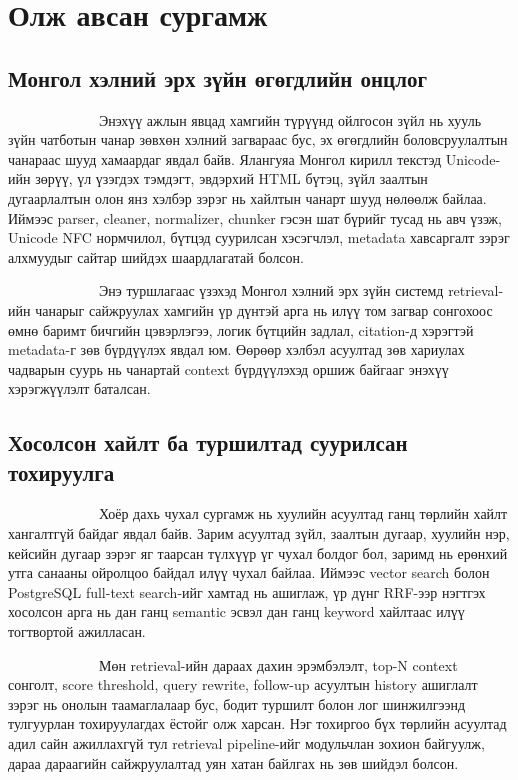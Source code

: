 \documentclass[12pt,A4]{report}
\begin{document}
\chapter{Олж авсан сургамж}

\section{Монгол хэлний эрх зүйн өгөгдлийн онцлог}

\ \ \ \ \ \ \ \ \  \ \ \ \ Энэхүү ажлын явцад хамгийн түрүүнд ойлгосон зүйл нь хууль зүйн чатботын чанар зөвхөн хэлний загвараас бус, эх өгөгдлийн боловсруулалтын чанараас шууд хамаардаг явдал байв. Ялангуяа Монгол кирилл текстэд Unicode-ийн зөрүү, үл үзэгдэх тэмдэгт, эвдэрхий HTML бүтэц, зүйл заалтын дугаарлалтын олон янз хэлбэр зэрэг нь хайлтын чанарт шууд нөлөөлж байлаа. Иймээс parser, cleaner, normalizer, chunker гэсэн шат бүрийг тусад нь авч үзэж, Unicode NFC нормчилол, бүтцэд суурилсан хэсэгчлэл, metadata хавсаргалт зэрэг алхмуудыг сайтар шийдэх шаардлагатай болсон.

\ \ \ \ \ \ \ \ \  \ \ \ \ Энэ туршлагаас үзэхэд Монгол хэлний эрх зүйн системд retrieval-ийн чанарыг сайжруулах хамгийн үр дүнтэй арга нь илүү том загвар сонгохоос өмнө баримт бичгийн цэвэрлэгээ, логик бүтцийн задлал, citation-д хэрэгтэй metadata-г зөв бүрдүүлэх явдал юм. Өөрөөр хэлбэл асуултад зөв хариулах чадварын суурь нь чанартай context бүрдүүлэхэд оршиж байгааг энэхүү хэрэгжүүлэлт баталсан.

\section{Хосолсон хайлт ба туршилтад суурилсан тохируулга}

\ \ \ \ \ \ \ \ \  \ \ \ \ Хоёр дахь чухал сургамж нь хуулийн асуултад ганц төрлийн хайлт хангалтгүй байдаг явдал байв. Зарим асуултад зүйл, заалтын дугаар, хуулийн нэр, кейсийн дугаар зэрэг яг таарсан түлхүүр үг чухал болдог бол, заримд нь ерөнхий утга санааны ойролцоо байдал илүү чухал байлаа. Иймээс vector search болон PostgreSQL full-text search-ийг хамтад нь ашиглаж, үр дүнг RRF-ээр нэгтгэх хосолсон арга нь дан ганц semantic эсвэл дан ганц keyword хайлтаас илүү тогтвортой ажилласан.

\ \ \ \ \ \ \ \ \  \ \ \ \ Мөн retrieval-ийн дараах дахин эрэмбэлэлт, top-N context сонголт, score threshold, query rewrite, follow-up асуултын history ашиглалт зэрэг нь онолын таамаглалаар бус, бодит туршилт болон лог шинжилгээнд тулгуурлан тохируулагдах ёстойг олж харсан. Нэг тохиргоо бүх төрлийн асуултад адил сайн ажиллахгүй тул retrieval pipeline-ийг модульчлан зохион байгуулж, дараа дараагийн сайжруулалтад уян хатан байлгах нь зөв шийдэл болсон.
\end{document}
